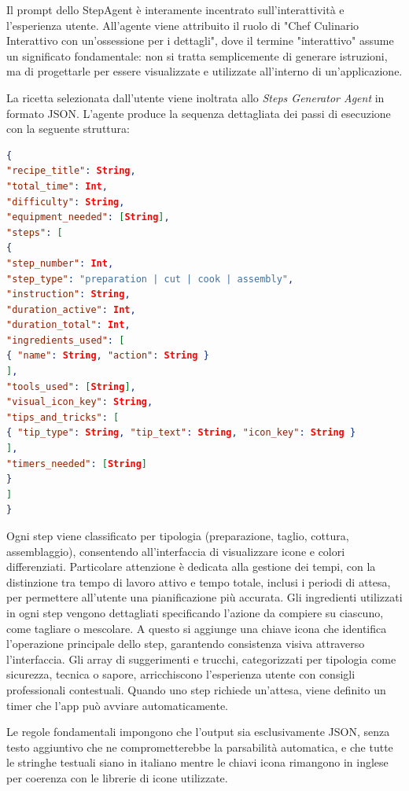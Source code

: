 Il prompt dello StepAgent è interamente incentrato sull'interattività e l'esperienza utente. All'agente viene attribuito il ruolo di "Chef Culinario Interattivo con un'ossessione per i dettagli", dove il termine "interattivo" assume un significato fondamentale: non si tratta semplicemente di generare istruzioni, ma di progettarle per essere visualizzate e utilizzate all'interno di un'applicazione.

La ricetta selezionata dall'utente viene inoltrata allo \textit{Steps Generator Agent} in formato JSON. L'agente produce la sequenza dettagliata dei passi di esecuzione con la seguente struttura:

\begin{lstlisting}[language=json]
{
"recipe_title": String,
"total_time": Int,
"difficulty": String,
"equipment_needed": [String],
"steps": [
{
"step_number": Int,
"step_type": "preparation | cut | cook | assembly",
"instruction": String,
"duration_active": Int,
"duration_total": Int,
"ingredients_used": [
{ "name": String, "action": String }
],
"tools_used": [String],
"visual_icon_key": String,
"tips_and_tricks": [
{ "tip_type": String, "tip_text": String, "icon_key": String }
],
"timers_needed": [String]
}
]
}
\end{lstlisting}

Ogni step viene classificato per tipologia (preparazione, taglio, cottura, assemblaggio), consentendo all'interfaccia di visualizzare icone e colori differenziati. Particolare attenzione è dedicata alla gestione dei tempi, con la distinzione tra tempo di lavoro attivo e tempo totale, inclusi i periodi di attesa, per permettere all'utente una pianificazione più accurata. Gli ingredienti utilizzati in ogni step vengono dettagliati specificando l'azione da compiere su ciascuno, come tagliare o mescolare. A questo si aggiunge una chiave icona che identifica l'operazione principale dello step, garantendo consistenza visiva attraverso l'interfaccia. Gli array di suggerimenti e trucchi, categorizzati per tipologia come sicurezza, tecnica o sapore, arricchiscono l'esperienza utente con consigli professionali contestuali. Quando uno step richiede un'attesa, viene definito un timer che l'app può avviare automaticamente.

Le regole fondamentali impongono che l'output sia esclusivamente JSON, senza testo aggiuntivo che ne comprometterebbe la parsabilità automatica, e che tutte le stringhe testuali siano in italiano mentre le chiavi icona rimangono in inglese per coerenza con le librerie di icone utilizzate.


